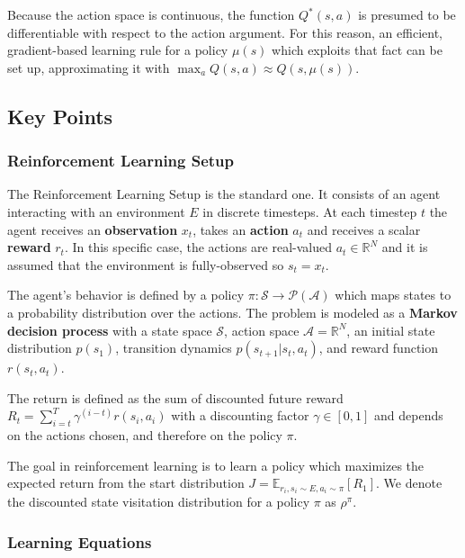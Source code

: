 \documentclass[a4paper, 11pt]{article}
\begin{document}
	Because the action space is continuous, the function $Q^*(s,a)$ is presumed to be differentiable with respect to the action argument. For this reason, an efficient, gradient-based learning rule for a policy $\mu(s)$ which exploits that fact can be set up, approximating it with $\max_a Q(s,a) \approx Q(s,\mu(s))$.
	
	\subsection{Key Points}
	\subsubsection{Reinforcement Learning Setup}
	The Reinforcement Learning Setup is the standard one. It consists of an agent interacting with an environment $\mathit{E}$ in discrete timesteps. At each timestep $t$ the agent receives an \textbf{observation} $x_t$, takes an \textbf{action} $a_t$ and receives a scalar \textbf{reward} $r_t$. In this specific case, the actions are real-valued $a_t \in \mathbb{R}^\mathit{N}$ and it is assumed that the environment is fully-observed so $s_t = x_t$.
	
	The agent’s behavior is defined by a policy $\pi : \mathcal{S} \rightarrow \mathcal{P}(\mathcal{A})$ which maps states to a probability distribution over the actions.
	The problem is modeled as a \textbf{Markov decision process} with a state space $\mathcal{S}$, action space $\mathcal{A} = \mathbb{R}^N$, an initial state distribution $p(s_1)$, transition dynamics $p(s_{t+1}|s_t,a_t)$, and reward function $r(s_t,a_t)$.
	
	The return is defined as the sum of discounted future reward $R_t=\sum_{i=t}^{T}\gamma^{(i-t)}r(s_i,a_i)$ with a discounting factor $\gamma \in [0,1]$ and depends on the actions chosen, and therefore on the policy $\pi$.
	
	The goal in reinforcement learning is to learn a policy which maximizes the expected return from the start distribution $J=\mathbb{E}_{r_i,s_i\sim E,a_i\sim \pi}[R_1]$.  We denote the discounted state visitation distribution for a policy $\pi$ as $\rho^\pi$.
	
	\subsubsection{Learning Equations}
	
\end{document}

